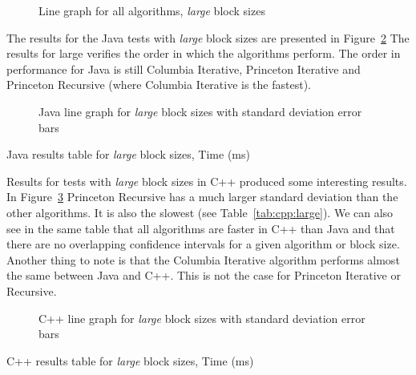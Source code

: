 \begin{figure}
    \centering
    
    \caption{Line graph for all algorithms, \emph{large} block sizes}
    \label{fig:all:line:large}
\end{figure}

The results for the Java tests with \emph{large} block sizes are presented in Figure~\ref{fig:java:line:large} The results for large verifies the order in which the algorithms perform. The order in performance for Java is still Columbia Iterative, Princeton Iterative and Princeton Recursive (where Columbia Iterative is the fastest).

\begin{figure}
    \centering
    
    \caption{Java line graph for \emph{large} block sizes with standard deviation error bars}
    \label{fig:java:line:large}
\end{figure}
\begin{table}
    \centering
    \caption{Java results table for \emph{large} block sizes, Time (ms)}
    \label{tab:java:large}
    
\end{table}

Results for tests with \emph{large} block sizes in C++ produced some interesting results. In Figure~\ref{fig:cpp:line:large} Princeton Recursive has a much larger standard deviation than the other algorithms. It is also the slowest (see Table~\ref{tab:cpp:large}). We can also see in the same table that all algorithms are faster in C++ than Java and that there are no overlapping confidence intervals for a given algorithm or block size. Another thing to note is that the Columbia Iterative algorithm performs almost the same between Java and C++. This is not the case for Princeton Iterative or Recursive.

\begin{figure}
    \centering
    
    \caption{C++ line graph for \emph{large} block sizes with standard deviation error bars}
    \label{fig:cpp:line:large}
\end{figure}
\begin{table}
    \centering
    \caption{C++ results table for \emph{large} block sizes, Time (ms)}
    \label{tab:cpp:large}
    \resizebox{\columnwidth}{!}{
        
    }
\end{table}

